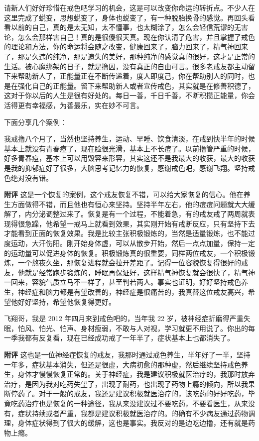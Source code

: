 请新人们好好珍惜在戒色吧学习的机会，这是可以改变你命运的转折点。不少人在这里完成了蜕变，思想蜕变了，身体也蜕变了，有一种脱胎换骨的感觉。再回头看看以前的自己，真的是太无知，太不懂事，也太糊涂了，怎么会轻信荒谬的无害论，怎么会那样害自己！真的是很傻很天真。现在你认清了危害，并且掌握了戒色的理论和方法，你的命运将会随之改变，健康回来了，脑力回来了，精气神回来了，那是久违的纯净，那是遗失的美好，那种纯净的感觉真的很好，这才是正常的生活。被心魔绑架的日子，就是撸囚，没有真正的自由可言。很多老戒友都主动留下来帮助新人了，正能量正在不断传递着，度人即度己，你在帮助别人的同时，也是在强化自己的正能量。留下来帮助新人或者宣传戒色，其实就是在修善积德了，这对于你以后的人生是很有好处的。每日一善，千日千善，不断积攒正能量，你会活得更有幸福感，为善最乐，实在妙不可言。

下面分享几个案例：

\begin{case}
    我戒撸八个月了，当然也坚持养生，运动、早睡、饮食清淡，在戒到快半年的时候基本上就没有青春痘了，现在脸很光滑，基本上不长痘了。以前撸管严重的时候，好多青春痘，基本上可以用毁容来形容，其实这还不是我最大的收获，最大的收获是我的抑郁症好了很多，大脑思考记忆力的恢复，感谢戒色吧，感谢飞翔。坚持戒色绝对没有错。

    \textbf{附评} 这是一个恢复的案例，这个戒友恢复不错，可以给大家恢复的信心。他在养生方面做得不错，而且他也有恒心来坚持。坚持半年左右，他的痘痘问题就大大缓解了，内分泌调整过来了。恢复是有一个过程，不能着急，有的戒友戒了两周就表现得很急躁，他希望一戒马上就看到效果，其实刚开始有戒断反应，只有坚持下去才能看到正面的恢复效果。我是比较主张积极锻炼的，当然是适量锻炼，也不能过度运动，大汗伤阳。刚开始身体虚，可以从散步开始，然后一点点加量，保持一定的运动量可以促进身体的恢复。积极锻炼真的很重要，同样两位戒友，一个积极锻炼，一个熬夜久坐，那恢复进程就会拉开差距了。记得一位容貌恢复得很好的戒友，他就是经常跑步锻炼的，睡眠再保证好，这样精气神恢复就会很快了，精气神一回来，容貌气质立马不一样了，甚至判若两人。事实也证明，好好坚持戒色养生，神经症和脑力都是有望改善的，神经症是很痛苦的，我真替这位戒友高兴，希望他好好坚持，希望他恢复得更好。
\end{case}

\begin{case}
    飞翔哥，我是 2012 年四月来到戒色吧的，当年我 22 岁，被神经症折磨得严重失眠，怕风、怕光、怕声、身材瘦弱，不敢与人对视，学习就更不用说了。你出的每一季我都有反复看，现在已经成功戒了一年半了，症状基本上也都消失了。

    \textbf{附评} 这也是一位神经症恢复的戒友，我那时通过戒色养生，半年好了一半，坚持一年多，症状基本消失，但还是很虚，大病初愈的那种虚，然后继续坚持戒色养生，身体才慢慢恢复正常的。关于神经症，我是建议积极就医治疗的，我那时放弃治疗，是因为我对吃药失望了，出现了耐药，也出现了药物上瘾的倾向，所以我果断停药了。对于一般的戒友，我还是建议积极就医治疗的，该吃药的好好吃药，毕竟吃药治疗也是恢复的一种途径，我从来没建议过不要吃药，不要看医生，从来没有，症状持续或者严重，我都是建议积极就医治疗的。的确有不少病友通过药物调理，身体症状得到了很大的缓解，这也是事实。我反对的是边吃边撸，还有就是药物上瘾。
\end{case}

